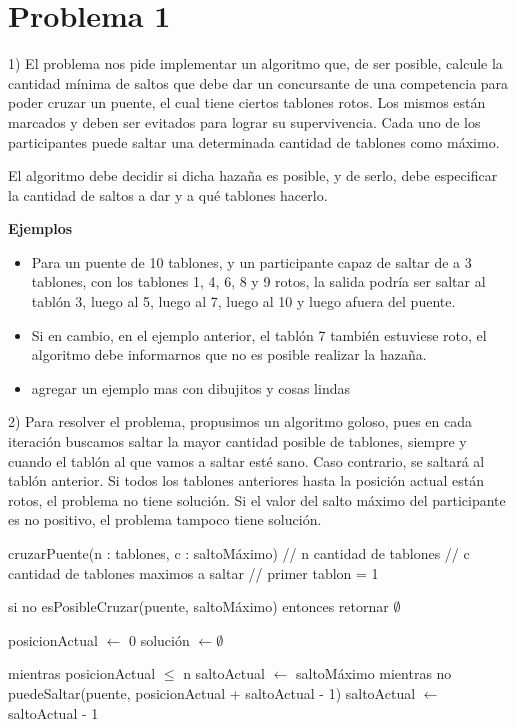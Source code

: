 \documentclass[a4paper]{article}
\begin{document}
\section{Problema 1}

1) El problema nos pide implementar un algoritmo que, de ser posible, calcule la
cantidad mínima de saltos que debe dar un concursante de una competencia para
poder cruzar un puente, el cual tiene ciertos tablones rotos. Los mismos están
marcados y deben ser evitados para lograr su supervivencia. Cada uno de los
participantes puede saltar una determinada cantidad de tablones como máximo.

El algoritmo debe decidir si dicha hazaña es posible, y de serlo, debe especificar
la cantidad de saltos a dar y a qué tablones hacerlo.

\textbf{Ejemplos}
\begin{itemize}
  \item Para un puente de 10 tablones, y un participante capaz de saltar de a 3
  tablones, con los tablones 1, 4, 6, 8 y 9 rotos, la salida podría ser saltar al
  tablón 3, luego al 5, luego al 7, luego al 10 y luego afuera del puente.
  \item Si en cambio, en el ejemplo anterior, el tablón 7 también estuviese roto,
  el algoritmo debe informarnos que no es posible realizar la hazaña.
  \item agregar un ejemplo mas con dibujitos y cosas lindas
\end{itemize}


2) Para resolver el problema, propusimos un algoritmo goloso, pues en cada iteración
buscamos saltar la mayor cantidad posible de tablones, siempre y cuando el tablón
al que vamos a saltar esté sano. Caso contrario, se saltará al tablón anterior.
Si todos los tablones anteriores hasta la posición actual están rotos, el problema
no tiene solución. Si el valor del salto máximo del participante es no positivo,
el problema tampoco tiene solución.

cruzarPuente(n : tablones, c : saltoMáximo)
  // n cantidad de tablones
  // c cantidad de tablones maximos a saltar
  // primer tablon = 1

  si no esPosibleCruzar(puente, saltoMáximo) entonces retornar $\emptyset$

  posicionActual $\gets$ 0
  solución $\gets \emptyset$

  mientras posicionActual $\leq$ n
    saltoActual $\gets$ saltoMáximo
    mientras no puedeSaltar(puente, posicionActual + saltoActual - 1)
      saltoActual $\gets$ saltoActual - 1
\end{document}
